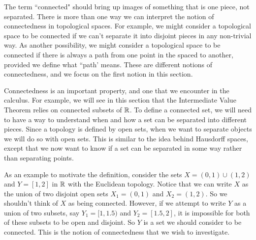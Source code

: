 \label{chap:Connected_topology}


\vspace*{-17 pt}

\vspace*{13 pt}

\label{sec_connect_top_intro}

The term ``connected" should bring up images of something that is one piece, not separated. There is more than one way we can interpret the notion of connectedness in topological spaces. For example, we might consider a topological space to be connected if we can't separate it into disjoint pieces in any non-trivial way. As another possibility, we might consider a topological space to be connected if there is always a path from one point in the spaced to another, provided we define what ``path' means. These are different notions of connectedness, and we focus on the first notion in this section.

Connectedness is an important property, and one that we encounter in the calculus. For example, we will see in this section that the Intermediate Value Theorem relies on connected subsets of $\mathbb{R}$. To define a connected set, we will need to have a way to understand when and how a set can be separated into different pieces. Since a topology is defined by open sets, when we want to separate objects we will do so with open sets. This is similar to the idea behind Hausdorff spaces, except that we now want to know if a set can be separated in some way rather than separating points.

As an example to motivate the definition, consider the sets $X = (0,1) \cup (1,2)$ and $Y = [1,2]$ in $\mathbb{R}$ with the Euclidean topology. Notice that we can write $X$ as the union of two disjoint open sets $X_1 = (0,1)$ and $X_2 = (1,2)$. So we shouldn't think of $X$ as being connected. However, if we attempt to write $Y$ as a union of two subsets, say $Y_1 = [1,1.5)$ and $Y_2 = [1.5,2]$, it is impossible for both of these subsets to be open and disjoint. So $Y$ is a set we should consider to be connected. This is the notion of connectedness that we wish to investigate. 

